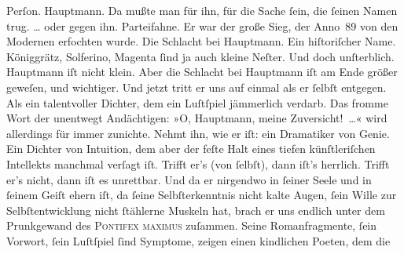 \begin{ledgroupsized}[t]{13cm}
{{                  Perſon. Hauptmann. Da mußte man für ihn,
                  für die Sache ſein, die ſeinen Namen trug. \textsc{\label{K_L03438-7v}\label{K_L03438-7h}}{ }{\dots} oder gegen ihn. Parteifahne. Er war der große Sieg,
                  der Anno 89 von den Modernen erfochten wurde. Die Schlacht bei Hauptmann. Ein hiſtoriſcher Name. Königgrätz, Solferino,
                     Magenta ſind ja auch kleine Neſter. Und
                  doch unſterblich. Hauptmann iſt nicht
                  klein. Aber die Schlacht bei Hauptmann iſt
                  am Ende größer geweſen, und wichtiger. Und jetzt tritt er uns auf einmal als er
                  ſelbſt entgegen. Als ein talentvoller Dichter, dem ein Luſtſpiel jämmerlich
                  verdarb. Das fromme Wort der unentwegt Andächtigen: »O, Hauptmann, meine Zuversicht! {\dots}«
                  wird allerdings für immer zunichte. Nehmt ihn, wie er iſt: ein Dramatiker von
                  Genie. Ein Dichter von Intuition, dem aber der feſte Halt eines tiefen
                  künſtleriſchen Intellekts manchmal verſagt iſt. Trifft er’s (von ſelbſt), dann
                  iſt’s herrlich. Trifft er’s nicht, dann iſt es unrettbar. Und da er nirgendwo in
                  ſeiner Seele und in ſeinem Geiſt ehern iſt, da ſeine Selbſterkenntnis nicht kalte
                  Augen, ſein Wille zur Selbſtentwicklung nicht ſtählerne Muskeln hat, brach er uns
                  endlich unter dem Prunkgewand des \textsc{Pontifex maximus}
                  zuſammen. Seine Romanfragmente, ſein Vorwort, ſein Luſtſpiel ſind Symptome, zeigen einen kindlichen Poeten, dem die
}}
\end{ledgroupsized}
